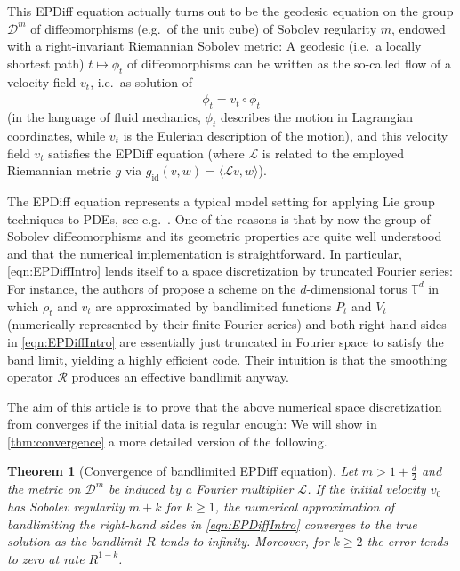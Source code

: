 \documentclass[a4paper, 12pt]{article}
\newtheorem{theorem}{Theorem}
\newcommand{\T}{\mathbb{T}}
\newcommand{\id}{\mathrm{id}}
\newcommand{\DiffSob}{\mathcal D}
\newcommand{\Riesz}{\mathcal{R}}
\renewcommand{\L}{\mathcal{L}}
\begin{document}
This EPDiff equation actually turns out to be the geodesic equation on the group $\DiffSob^m$ of diffeomorphisms (e.g.\ of the unit cube) of Sobolev regularity $m$, endowed with a right-invariant Riemannian Sobolev metric:
A geodesic (i.e.\ a locally shortest path) $t\mapsto\phi_t$ of diffeomorphisms can be written as the so-called flow of a velocity field $v_t$, i.e.\ as solution of
\begin{equation*}
\dot\phi_t=v_t\circ\phi_t
\end{equation*}
(in the language of fluid mechanics, $\phi_t$ describes the motion in Lagrangian coordinates, while $v_t$ is the Eulerian description of the motion),
and this velocity field $v_t$ satisfies the EPDiff equation (where $\L$ is related to the employed Riemannian metric $g$ via $g_\id(v,w)=\langle\L v,w\rangle$).

The EPDiff equation represents a typical model setting for applying Lie group techniques to PDEs, see e.g.\ \cite{TrYo15,MiPr10}.
One of the reasons is that by now the group of Sobolev diffeomorphisms and its geometric properties are quite well understood \cite{MiPr10,BrVi17,GuRaRuWi23}
and that the numerical implementation is straightforward.
In particular, \eqref{eqn:EPDiffIntro} lends itself to a space discretization by truncated Fourier series:
For instance, the authors of \cite{ZhFl19} propose a scheme on the $d$-dimensional torus $\T^d$ in which $\rho_t$ and $v_t$ are approximated by bandlimited functions $P_t$ and $V_t$ (numerically represented by their finite Fourier series)
and both right-hand sides in \eqref{eqn:EPDiffIntro} are essentially just truncated in Fourier space to satisfy the band limit, yielding a highly efficient code.
Their intuition is that the smoothing operator $\Riesz$ produces an effective bandlimit anyway.

The aim of this article is to prove that the above numerical space discretization from \cite{ZhFl19} converges if the initial data is regular enough:
We will show in \cref{thm:convergence} a more detailed version of the following.

\begin{theorem}[Convergence of bandlimited EPDiff equation]
Let $m>1+\frac d2$ and the metric on $\DiffSob^m$ be induced by a Fourier multiplier $\L$.
If the initial velocity $v_0$ has Sobolev regularity $m+k$ for $k\geq1$,
the numerical approximation of bandlimiting the right-hand sides in \eqref{eqn:EPDiffIntro} converges to the true solution as the bandlimit $R$ tends to infinity.
Moreover, for $k\geq2$ the error tends to zero at rate $R^{1-k}$.
\end{theorem}
\end{document}
